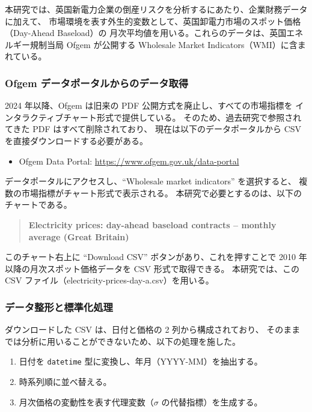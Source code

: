 本研究では、英国新電力企業の倒産リスクを分析するにあたり、企業財務データに加えて、
市場環境を表す外生的変数として、英国卸電力市場のスポット価格（Day-Ahead Baseload）の
月次平均値を用いる。これらのデータは、英国エネルギー規制当局 Ofgem が公開する
Wholesale Market Indicators（WMI）に含まれている。


\subsubsection*{Ofgem データポータルからのデータ取得}

2024 年以降、Ofgem は旧来の PDF 公開方式を廃止し、すべての市場指標を
インタラクティブチャート形式で提供している。
そのため、過去研究で参照されてきた PDF はすべて削除されており、
現在は以下のデータポータルから CSV を直接ダウンロードする必要がある。


\begin{itemize}
  \item Ofgem Data Portal: \url{https://www.ofgem.gov.uk/data-portal}
\end{itemize}


データポータルにアクセスし、``Wholesale market indicators'' を選択すると、
複数の市場指標がチャート形式で表示される。
本研究で必要とするのは、以下のチャートである。

\begin{quote}
\textbf{Electricity prices: day-ahead baseload contracts -- monthly average (Great Britain)}
\end{quote}

このチャート右上に ``Download CSV'' ボタンがあり、これを押すことで
2010 年以降の月次スポット価格データを CSV 形式で取得できる。
本研究では、この CSV ファイル（electricity-prices-day-a.csv）を用いる。


\subsubsection*{データ整形と標準化処理}

ダウンロードした CSV は、日付と価格の 2 列から構成されており、
そのままでは分析に用いることができないため、以下の処理を施した。

\begin{enumerate}
  \item 日付を \texttt{datetime} 型に変換し、年月（YYYY-MM）を抽出する。
  \item 時系列順に並べ替える。
  \item 月次価格の変動性を表す代理変数（$\sigma$ の代替指標）を生成する。
\end{enumerate}


